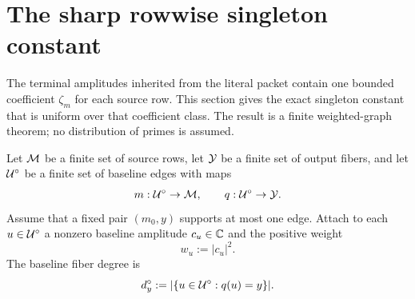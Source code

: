 \section{The sharp rowwise singleton constant}
\label{sec:tpc57-row-minimax}

The terminal amplitudes inherited from the literal packet contain one
bounded coefficient \(\zeta_m\) for each source row.  This section gives
the exact singleton constant that is uniform over that coefficient class.
The result is a finite weighted-graph theorem; no distribution of primes is
assumed.

Let \(\mathcal M\) be a finite set of source rows, let \(\mathcal Y\) be a finite set of
output fibers, and let \(\mathcal U^\circ\) be a finite set of baseline edges with
maps
\begin{equation}
 m:\mathcal U^\circ\to\mathcal M,
 \qquad
 q:\mathcal U^\circ\to\mathcal Y.
 \label{eq:tpc57-row-fiber-maps}
\end{equation}
Assume that a fixed pair \((m_0,y)\) supports at most one edge.  Attach to
each \(u\in\mathcal U^\circ\) a nonzero baseline amplitude \(c_u\in\mathbb C\) and the
positive weight
\begin{equation}
 w_u:=|c_u|^2.
 \label{eq:tpc57-baseline-edge-weight}
\end{equation}
The baseline fiber degree is
\begin{equation}
 d_y^\circ:=|\{u\in\mathcal U^\circ:q(u)=y\}|.
 \label{eq:tpc57-baseline-fiber-degree}
\end{equation}

